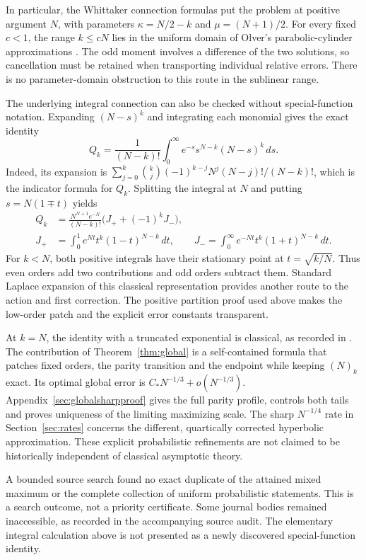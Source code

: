 In particular, the Whittaker connection formulas put the problem at positive argument $N$, with parameters $\kappa=N/2-k$ and $\mu=(N+1)/2$. For every fixed $c<1$, the range $k\le cN$ lies in the uniform domain of Olver's parabolic-cylinder approximations \cite{Olver,DLMFWhittaker}. The odd moment involves a difference of the two solutions, so cancellation must be retained when transporting individual relative errors. There is no parameter-domain obstruction to this route in the sublinear range.

The underlying integral connection can also be checked without special-function notation. Expanding $(N-s)^k$ and integrating each monomial gives the exact identity
\begin{equation}\label{eq:gammaidentity}
Q_k=\frac1{(N-k)!}\int_0^\infty
e^{-s}s^{N-k}(N-s)^k\,ds.
\end{equation}
Indeed, its expansion is
$\sum_{j=0}^k\binom kj(-1)^{k-j}N^j(N-j)!/(N-k)!$,
which is the indicator formula for $Q_k$. Splitting the integral at $N$ and putting $s=N(1\mp t)$ yields
\begin{align*}
Q_k&=\frac{N^{N+1}e^{-N}}{(N-k)!}
\bigl(J_++(-1)^kJ_-\bigr),\\
J_+&=\int_0^1 e^{Nt}t^k(1-t)^{N-k}\,dt,\qquad
J_-=\int_0^\infty e^{-Nt}t^k(1+t)^{N-k}\,dt.
\end{align*}
For $k<N$, both positive integrals have their stationary point at $t=\sqrt{k/N}$. Thus even orders add two contributions and odd orders subtract them. Standard Laplace expansion of this classical representation provides another route to the action and first correction. The positive partition proof used above makes the low-order patch and the explicit error constants transparent.

At $k=N$, the identity with a truncated exponential is classical, as recorded in \cite[Section 1]{DMO}. The contribution of Theorem~\ref{thm:global} is a self-contained formula that patches fixed orders, the parity transition and the endpoint while keeping $(N)_k$ exact. Its optimal global error is $C_*N^{-1/3}+o(N^{-1/3})$. Appendix~\ref{sec:globalsharpproof} gives the full parity profile, controls both tails and proves uniqueness of the limiting maximizing scale. The sharp $N^{-1/4}$ rate in Section~\ref{sec:rates} concerns the different, quartically corrected hyperbolic approximation. These explicit probabilistic refinements are not claimed to be historically independent of classical asymptotic theory.

A bounded source search found no exact duplicate of the attained mixed maximum or the complete collection of uniform probabilistic statements. This is a search outcome, not a priority certificate. Some journal bodies remained inaccessible, as recorded in the accompanying source audit. The elementary integral calculation above is not presented as a newly discovered special-function identity.

